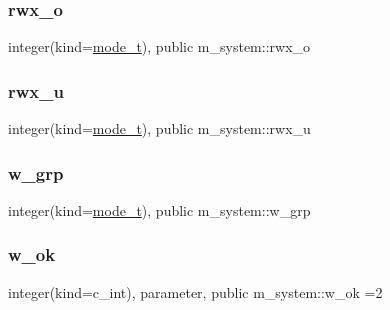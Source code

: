 \subsubsection{\texorpdfstring{rwx\+\_\+o}{rwx\_o}}
{\footnotesize\ttfamily integer(kind=\mbox{\hyperlink{namespacem__system_abdb5cc27c945379d844db4830d499050}{mode\+\_\+t}}), public m\+\_\+system\+::rwx\+\_\+o}

\mbox{\label{namespacem__system_a126dc96188cde6e9932e1775868b3059}} 
\subsubsection{\texorpdfstring{rwx\+\_\+u}{rwx\_u}}
{\footnotesize\ttfamily integer(kind=\mbox{\hyperlink{namespacem__system_abdb5cc27c945379d844db4830d499050}{mode\+\_\+t}}), public m\+\_\+system\+::rwx\+\_\+u}

\mbox{\label{namespacem__system_afbbb4a0d04bc0dbaad651a6ab04ffaef}} 
\subsubsection{\texorpdfstring{w\+\_\+grp}{w\_grp}}
{\footnotesize\ttfamily integer(kind=\mbox{\hyperlink{namespacem__system_abdb5cc27c945379d844db4830d499050}{mode\+\_\+t}}), public m\+\_\+system\+::w\+\_\+grp}

\mbox{\label{namespacem__system_a8f34e61e94106b90ca48b9ef1165474c}} 
\subsubsection{\texorpdfstring{w\+\_\+ok}{w\_ok}}
{\footnotesize\ttfamily integer(kind=c\+\_\+int), parameter, public m\+\_\+system\+::w\+\_\+ok =2}

\mbox{\label{namespacem__system_a82b69c635bb9cd191b867efdf2003d9b}} 
